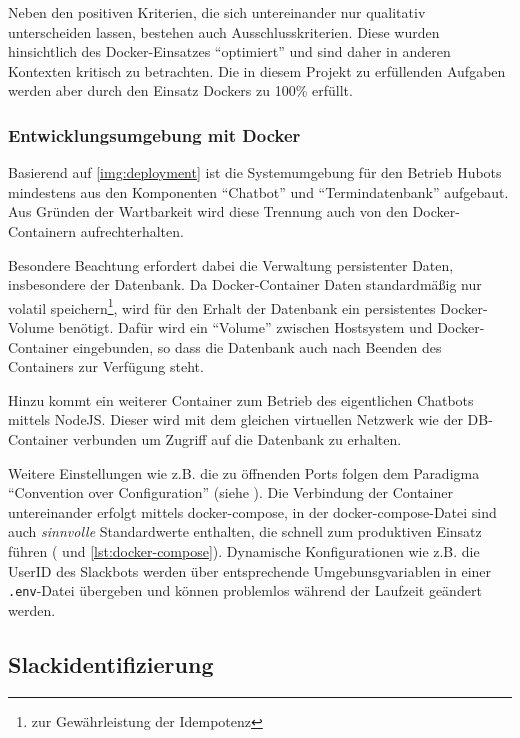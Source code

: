 Neben den positiven Kriterien, die sich untereinander nur qualitativ unterscheiden lassen, bestehen auch Ausschlusskriterien. Diese wurden hinsichtlich des Docker-Einsatzes \enquote{optimiert} und sind daher in anderen Kontexten kritisch zu betrachten. Die in diesem Projekt zu erfüllenden Aufgaben werden aber durch den Einsatz Dockers zu 100\% erfüllt.

\subsubsection{Entwicklungsumgebung mit Docker}

Basierend auf \autoref{img:deployment} ist die Systemumgebung für den Betrieb Hubots mindestens aus den Komponenten \enquote{Chatbot} und \enquote{Termindatenbank} aufgebaut. Aus Gründen der Wartbarkeit wird diese Trennung auch von den Docker-Containern aufrechterhalten.

Besondere Beachtung erfordert dabei die Verwaltung persistenter Daten, insbesondere der Datenbank. Da Docker-Container Daten standardmäßig nur volatil speichern\footnote{zur Gewährleistung der Idempotenz}, wird für den Erhalt der Datenbank ein persistentes Docker-Volume benötigt. Dafür wird ein \enquote{Volume} zwischen Hostsystem und Docker-Container eingebunden, so dass die Datenbank auch nach Beenden des Containers zur Verfügung steht.

Hinzu kommt ein weiterer Container zum Betrieb des eigentlichen Chatbots mittels NodeJS. Dieser wird mit dem gleichen virtuellen Netzwerk wie der DB-Container verbunden um Zugriff auf die Datenbank zu erhalten.

Weitere Einstellungen wie z.B. die zu öffnenden Ports folgen dem Paradigma \enquote{Convention over Configuration} (siehe \cite{NicholasChenConventionConfiguration2006}). Die Verbindung der Container untereinander erfolgt mittels docker-compose, in der docker-compose-Datei sind auch \textit{sinnvolle} Standardwerte enthalten, die schnell zum produktiven Einsatz führen (\cite{DockerCompose2018} und \autoref{lst:docker-compose}).
Dynamische Konfigurationen wie z.B. die UserID des Slackbots werden über entsprechende Umgebunsgvariablen in einer \verb+.env+-Datei übergeben und können problemlos während der Laufzeit geändert werden.





\subsection{Slackidentifizierung}

